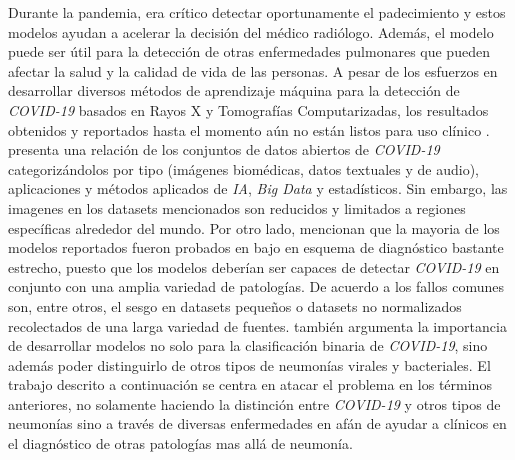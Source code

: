Durante la pandemia, era crítico detectar oportunamente el padecimiento y estos modelos ayudan a
acelerar la decisión del médico radiólogo. Además, el modelo puede ser útil para la detección de
otras enfermedades pulmonares que pueden afectar la salud y la calidad de vida de las personas. A
pesar de los esfuerzos en desarrollar diversos métodos de aprendizaje máquina para la detección de
\textit{COVID-19} basados en Rayos X y Tomografías Computarizadas, los resultados obtenidos y
reportados hasta el momento aún no están listos para uso clínico \cite{roberts2021common}.
\citeauthor{shuja2021covid} presenta una relación de los conjuntos de datos abiertos de
\textit{COVID-19} categorizándolos por tipo (imágenes biomédicas,
datos textuales y de audio), aplicaciones y métodos aplicados de \textit{IA}, \textit{Big Data} y
estadísticos. Sin embargo, las imagenes en los datasets mencionados son reducidos y limitados a
regiones específicas alrededor del mundo. Por otro lado, \citeauthor{greenspan2020position} mencionan
que la mayoria de los modelos reportados fueron probados en bajo en esquema de diagnóstico bastante
estrecho, puesto que los modelos deberían ser capaces de detectar \textit{COVID-19} en conjunto
con una amplia variedad de patologías. De acuerdo a \citeauthor{roberts2021common} los fallos comunes
son, entre otros, el sesgo en datasets pequeños o datasets no normalizados recolectados de una larga
variedad de fuentes. \citeauthor{roberts2021common} también argumenta la importancia de desarrollar
modelos no solo para la clasificación binaria de \textit{COVID-19}, sino además poder distinguirlo
de otros tipos de neumonías virales y bacteriales. El trabajo descrito a continuación se centra en
atacar el problema en los términos anteriores, no solamente haciendo la distinción entre
\textit{COVID-19} y otros tipos de neumonías sino a través de diversas enfermedades en afán de ayudar
a clínicos en el diagnóstico de otras patologías mas allá de neumonía.
